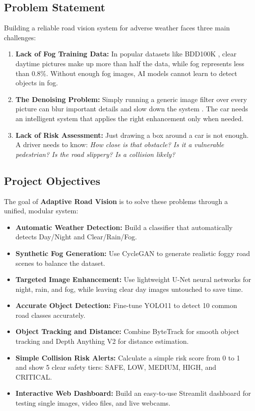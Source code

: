 \documentclass{article}
\begin{document}
\subsection{Problem Statement}
Building a reliable road vision system for adverse weather faces three main challenges:
\begin{enumerate}
    \item \textbf{Lack of Fog Training Data:} In popular datasets like BDD100K \cite{yu2020bdd100k}, clear daytime pictures make up more than half the data, while fog represents less than 0.8\%. Without enough fog images, AI models cannot learn to detect objects in fog.
    \item \textbf{The Denoising Problem:} Simply running a generic image filter over every picture can blur important details and slow down the system \cite{gupta2024robust}. The car needs an intelligent system that applies the right enhancement only when needed.
    \item \textbf{Lack of Risk Assessment:} Just drawing a box around a car is not enough. A driver needs to know: \emph{How close is that obstacle? Is it a vulnerable pedestrian? Is the road slippery? Is a collision likely?}
\end{enumerate}

\subsection{Project Objectives}
The goal of \textbf{Adaptive Road Vision} is to solve these problems through a unified, modular system:
\begin{itemize}
    \item \textbf{Automatic Weather Detection:} Build a classifier that automatically detects Day/Night and Clear/Rain/Fog.
    \item \textbf{Synthetic Fog Generation:} Use CycleGAN to generate realistic foggy road scenes to balance the dataset.
    \item \textbf{Targeted Image Enhancement:} Use lightweight U-Net neural networks for night, rain, and fog, while leaving clear day images untouched to save time.
    \item \textbf{Accurate Object Detection:} Fine-tune YOLO11 to detect 10 common road classes accurately.
    \item \textbf{Object Tracking and Distance:} Combine ByteTrack for smooth object tracking and Depth Anything V2 for distance estimation.
    \item \textbf{Simple Collision Risk Alerts:} Calculate a simple risk score from 0 to 1 and show 5 clear safety tiers: SAFE, LOW, MEDIUM, HIGH, and CRITICAL.
    \item \textbf{Interactive Web Dashboard:} Build an easy-to-use Streamlit dashboard for testing single images, video files, and live webcams.
\end{itemize}
\end{document}
